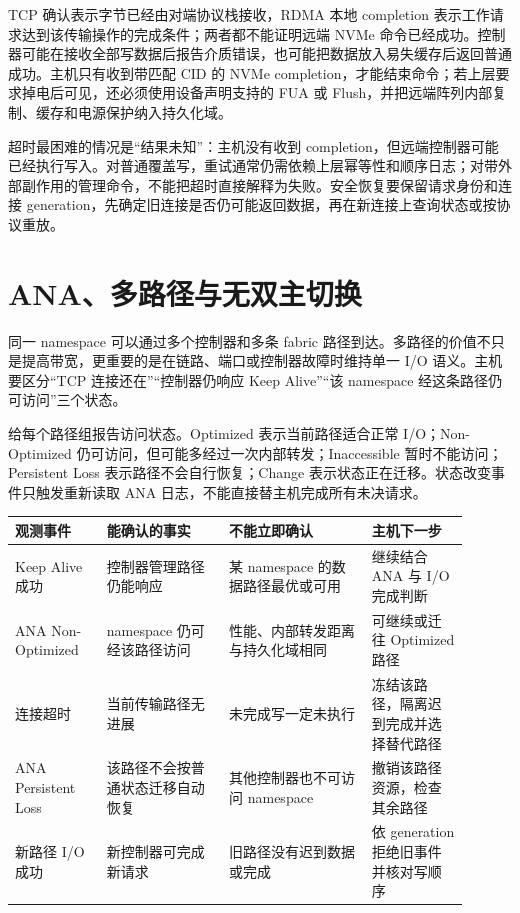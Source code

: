 
TCP 确认表示字节已经由对端协议栈接收，RDMA 本地 completion 表示工作请求达到该传输操作的完成条件；两者都不能证明远端 NVMe 命令已经成功。控制器可能在接收全部写数据后报告介质错误，也可能把数据放入易失缓存后返回普通成功。主机只有收到带匹配 CID 的 NVMe completion，才能结束命令；若上层要求掉电后可见，还必须使用设备声明支持的 FUA 或 Flush，并把远端阵列内部复制、缓存和电源保护纳入持久化域。

超时最困难的情况是“结果未知”：主机没有收到 completion，但远端控制器可能已经执行写入。对普通覆盖写，重试通常仍需依赖上层幂等性和顺序日志；对带外部副作用的管理命令，不能把超时直接解释为失败。安全恢复要保留请求身份和连接 generation，先确定旧连接是否仍可能返回数据，再在新连接上查询状态或按协议重放。

\section{ANA、多路径与无双主切换}

同一 namespace 可以通过多个控制器和多条 fabric 路径到达。多路径的价值不只是提高带宽，更重要的是在链路、端口或控制器故障时维持单一 I/O 语义。主机要区分“TCP 连接还在”“控制器仍响应 Keep Alive”“该 namespace 经这条路径仍可访问”三个状态。

给每个路径组报告访问状态。Optimized 表示当前路径适合正常 I/O；Non-Optimized 仍可访问，但可能多经过一次内部转发；Inaccessible 暂时不能访问；Persistent Loss 表示路径不会自行恢复；Change 表示状态正在迁移。状态改变事件只触发重新读取 ANA 日志，不能直接替主机完成所有未决请求。

\begin{longtable}{L{0.18\linewidth}L{0.24\linewidth}L{0.29\linewidth}L{0.19\linewidth}}
\toprule
观测事件 & 能确认的事实 & 不能立即确认 & 主机下一步 \\
\midrule
Keep Alive 成功 & 控制器管理路径仍能响应 & 某 namespace 的数据路径最优或可用 & 继续结合 ANA 与 I/O 完成判断 \\\tablerowrule
ANA Non-Optimized & namespace 仍可经该路径访问 & 性能、内部转发距离与持久化域相同 & 可继续或迁往 Optimized 路径 \\\tablerowrule
连接超时 & 当前传输路径无进展 & 未完成写一定未执行 & 冻结该路径，隔离迟到完成并选择替代路径 \\\tablerowrule
ANA Persistent Loss & 该路径不会按普通状态迁移自动恢复 & 其他控制器也不可访问 namespace & 撤销该路径资源，检查其余路径 \\\tablerowrule
新路径 I/O 成功 & 新控制器可完成新请求 & 旧路径没有迟到数据或完成 & 依 generation 拒绝旧事件并核对写顺序 \\
\bottomrule
\end{longtable}

